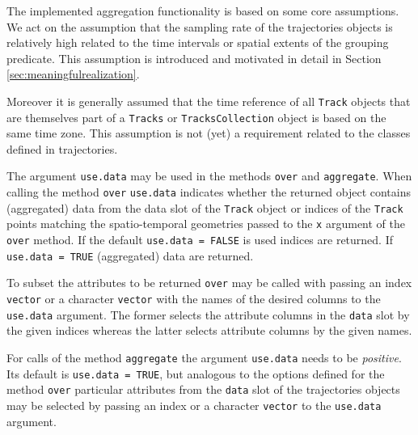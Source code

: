 \documentclass[12pt, oneside, a4paper]{scrbook}
\newcommand{\pkg}[1]{{\normalfont\fontseries{b}\selectfont #1}}
\let\code=\texttt
\begin{document}
The implemented aggregation functionality is based on some core assumptions. We act on the assumption that the sampling rate of the \pkg{trajectories} objects is relatively high related to the time intervals or spatial extents of the grouping predicate. This assumption is introduced and motivated in detail in Section \ref{sec:meaningfulrealization}.
\par\medskip
Moreover it is generally assumed that the time reference of all \code{Track} objects that are themselves part of a \code{Tracks} or \code{TracksCollection} object is based on the same time zone.
This assumption is not (yet) a requirement related to the classes defined in \pkg{trajectories}.
\par\medskip



The argument \code{use.data} may be used in the methods \code{over} and \code{aggregate}. When calling the method \code{over} \code{use.data} indicates whether the returned object contains (aggregated) data from the data slot of the \code{Track} object or indices of the \code{Track} points matching the spatio-temporal geometries passed to the \code{x} argument of the \code{over} method. If the default \code{use.data = FALSE} is used indices are returned. If \code{use.data = TRUE} (aggregated) data are returned. 
\par\medskip
To subset the attributes to be returned \code{over} may be called with passing an index \code{vector} or a character \code{vector} with the names of the desired columns to the \code{use.data} argument. The former selects the attribute columns in the \code{data} slot by the given indices whereas the latter selects attribute columns by the given names.
\par\medskip
For calls of the method \code{aggregate} the argument \code{use.data} needs to be \textit{positive}. Its default is \code{use.data = TRUE}, but analogous to the options defined for the method \code{over} particular attributes from the \code{data} slot of the \pkg{trajectories} objects may be selected by passing an index or a character \code{vector} to the \code{use.data} argument.
\par\medskip
\end{document}
